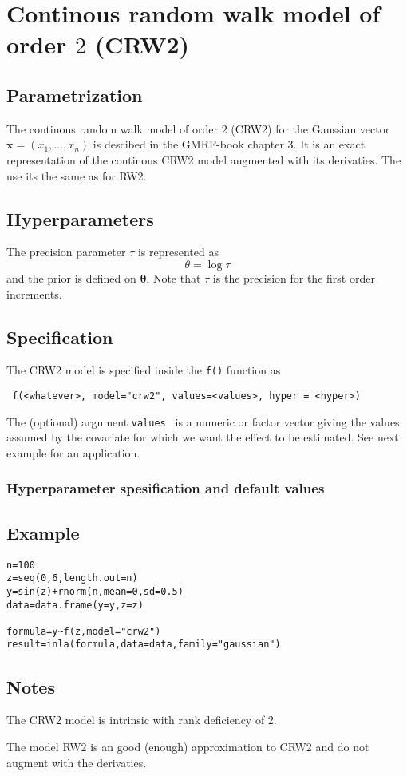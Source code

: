 \documentclass[a4paper,11pt]{article}
\begin{document}
\section*{Continous random walk model of order $2$ (CRW2)}

\subsection*{Parametrization}

The continous random walk model of order $2$ (CRW2) for the Gaussian
vector $\mathbf{x}=(x_1,\dots,x_n)$ is descibed in the GMRF-book
chapter 3. It is an exact representation of the continous CRW2 model
augmented with its derivaties. The use its the same as for RW2. 

\subsection*{Hyperparameters}

The precision parameter $\tau$ is represented as
\begin{displaymath}
    \theta =\log \tau
\end{displaymath}
and the prior is defined on $\mathbf{\theta}$. Note that $\tau$ is the
precision for the first order increments.

\subsection*{Specification}

The CRW2 model is specified inside the {\tt f()} function as
\begin{verbatim}
 f(<whatever>, model="crw2", values=<values>, hyper = <hyper>)
\end{verbatim}
The (optional) argument {\tt values } is a numeric or factor vector
giving the values assumed by the covariate for which we want the
effect to be estimated. See next example for an application.
 
\subsubsection*{Hyperparameter spesification and default values}



\subsection*{Example}

\begin{verbatim}
n=100
z=seq(0,6,length.out=n)
y=sin(z)+rnorm(n,mean=0,sd=0.5)
data=data.frame(y=y,z=z)

formula=y~f(z,model="crw2")
result=inla(formula,data=data,family="gaussian")
\end{verbatim}


\subsection*{Notes}

The CRW2 model is intrinsic with rank deficiency of 2.

The model RW2 is an good (enough) approximation to CRW2 and do not
augment with the derivaties.
\end{document}
